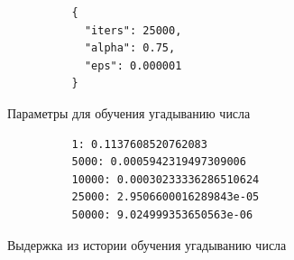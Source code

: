 \documentclass[bachelor, och, pract_otchet]{SCWorks}
\begin{document}
      \begin{listing}[H]
        \begin{verbatim}
          {
            "iters": 25000,
            "alpha": 0.75,
            "eps": 0.000001
          }
        \end{verbatim}
        \caption{Параметры для обучения угадыванию числа}
      \end{listing}

      \begin{listing}[H]
        \begin{verbatim}
          1: 0.1137608520762083
          5000: 0.0005942319497309006
          10000: 0.00030233336286510624
          25000: 2.9506600016289843e-05
          50000: 9.024999353650563e-06
        \end{verbatim}
        \caption{Выдержка из истории обучения угадыванию числа}
      \end{listing}
\end{document}
